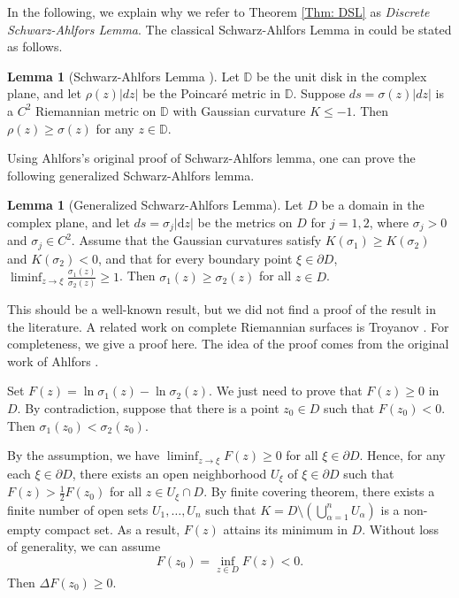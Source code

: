 \documentclass[12pt]{amsart}
\theoremstyle{definition}
\newtheorem{lemma}[theorem]{Lemma}
\begin{document}
In the following, we explain why we refer to Theorem \ref{Thm: DSL} as \textit{Discrete Schwarz-Ahlfors Lemma}. The classical Schwarz-Ahlfors Lemma in \cite{Ah} could be stated as follows.
\begin{lemma}[Schwarz-Ahlfors Lemma \cite{Ah}]
\label{Lem: SAL}
Let $\mathbb{D}$ be the unit disk in the complex plane, and let $\rho(z)|dz|$ be the Poincar\'{e} metric in $\mathbb{D}$. Suppose $ds=\sigma(z)|dz|$ is a $C^2$ Riemannian metric on $\mathbb{D}$ with Gaussian curvature $K\leq -1$.
Then $\rho(z)\geq \sigma(z)$ for any $z\in \mathbb{D}$.
\end{lemma}

Using Ahlfors's original proof of Schwarz-Ahlfors lemma, one can prove the following generalized Schwarz-Ahlfors lemma.
\begin{lemma}[Generalized Schwarz-Ahlfors Lemma]
\label{Lem: GSAL}
Let $D$ be a domain in the complex plane, and let $ds=\sigma_j|\mathrm{d}z|$ be the metrics on $D$ for $j=1,2$, where $\sigma_j>0$ and $\sigma_j \in C^2$. 
Assume that the Gaussian curvatures satisfy $K(\sigma_1)\geq K(\sigma_2)$ and $K(\sigma_2)<0$,
and that for every boundary point $\xi \in \partial D$, $\liminf_{z \to \xi} \frac{\sigma_1(z)}{\sigma_2(z)} \geq 1$.
Then $\sigma_1(z) \geq \sigma_2(z)$ for all $z\in D$.
\end{lemma}

\proof
This should be a well-known result, but we did not find a proof of the result in the literature.
A related work on complete Riemannian surfaces is Troyanov \cite{Tr}.
For completeness, we give a proof here. The idea of the proof comes from the original work of Ahlfors \cite{Ah}.

Set $F(z)=\ln\sigma_1(z)-\ln\sigma_2(z)$. We just need to prove that $F(z)\geq 0$ in $D$.
By contradiction, suppose that there is a point $z_0\in D$ such that $F(z_0)<0$. Then $\sigma_1(z_0) < \sigma_2(z_0)$.

By the assumption, we have $\liminf_{z\to\xi}F(z)\geq 0$ for all $\xi\in\partial D$.
Hence, for any each $\xi\in\partial D$,
there exists an open neighborhood $U_\xi$ of $\xi\in\partial D$ such that $F(z)> \frac{1}{2}F(z_0)$ for all $z\in U_\xi\cap D$.
By finite covering theorem, there exists a finite number of open sets $U_1, \ldots, U_n$ such that $K=D \setminus \left(\bigcup_{\alpha=1}^n U_\alpha \right)$
is a non-empty compact set.
As a result, $F(z)$ attains its minimum in $D$. Without loss of generality, we can assume
$$F(z_0)=\inf_{z\in D}F(z)<0.$$
Then $\Delta F(z_0)\geq0$.
\end{document}

